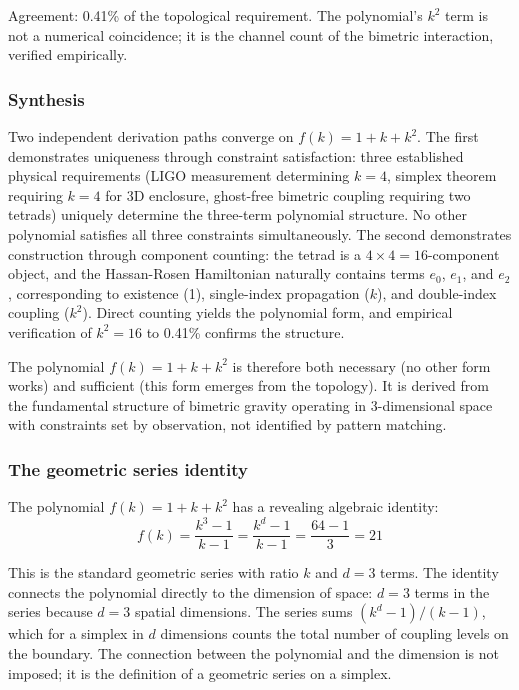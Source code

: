 \documentclass[aps,prd,preprint,superscriptaddress,showpacs,preprintnumbers,amsmath,amssymb,nofootinbib]{revtex4-2}
\begin{document}
Agreement: 0.41\% of the topological requirement. The polynomial's $k^2$ term is not a numerical coincidence; it is the channel count of the bimetric interaction, verified empirically.

\subsubsection*{Synthesis}

Two independent derivation paths converge on $f(k) = 1 + k + k^2$. The first demonstrates uniqueness through constraint satisfaction: three established physical requirements (LIGO measurement determining $k=4$, simplex theorem requiring $k=4$ for 3D enclosure, ghost-free bimetric coupling requiring two tetrads) uniquely determine the three-term polynomial structure. No other polynomial satisfies all three constraints simultaneously. The second demonstrates construction through component counting: the tetrad is a $4 \times 4 = 16$-component object, and the Hassan-Rosen Hamiltonian naturally contains terms $e_0$, $e_1$, and $e_2$, corresponding to existence (1), single-index propagation ($k$), and double-index coupling ($k^2$). Direct counting yields the polynomial form, and empirical verification of $k^2 = 16$ to 0.41\% confirms the structure.

The polynomial $f(k) = 1 + k + k^2$ is therefore both necessary (no other form works) and sufficient (this form emerges from the topology). It is derived from the fundamental structure of bimetric gravity operating in 3-dimensional space with constraints set by observation, not identified by pattern matching.

\subsubsection*{The geometric series identity}

The polynomial $f(k) = 1 + k + k^2$ has a revealing algebraic identity:
\begin{equation}
f(k) = \frac{k^3 - 1}{k - 1} = \frac{k^d - 1}{k - 1} = \frac{64 - 1}{3} = 21
\label{eq:geometric-series}
\end{equation}

This is the standard geometric series with ratio $k$ and $d = 3$ terms. The identity connects the polynomial directly to the dimension of space: $d = 3$ terms in the series because $d = 3$ spatial dimensions. The series sums $(k^d - 1)/(k - 1)$, which for a simplex in $d$ dimensions counts the total number of coupling levels on the boundary. The connection between the polynomial and the dimension is not imposed; it is the definition of a geometric series on a simplex.
\end{document}
